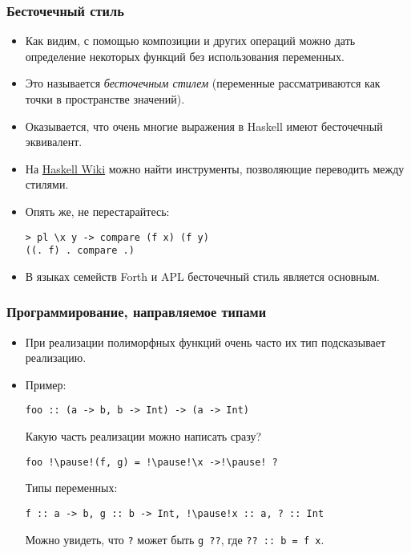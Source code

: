 \documentclass[10pt]{beamer}
\begin{document}
\begin{frame}[fragile]
\frametitle{Бесточечный стиль}
\begin{itemize}
    \item Как видим, с помощью композиции и других операций можно дать определение некоторых функций без использования переменных.
    \item Это называется \emph{бесточечным стилем} (переменные рассматриваются как точки в пространстве значений).\pause
    \item Оказывается, что очень многие выражения в Haskell имеют бесточечный эквивалент.
    \item На \href{https://wiki.haskell.org/Pointfree}{Haskell Wiki} можно найти инструменты, позволяющие переводить между стилями.
    \item Опять же, не перестарайтесь:
\begin{lstlisting}
> pl \x y -> compare (f x) (f y)
((. f) . compare .)
\end{lstlisting}\pause
    \item В языках семейств Forth и APL бесточечный стиль является основным.
\end{itemize}
\end{frame}

\begin{frame}[fragile]
\frametitle{Программирование, направляемое типами}
\begin{itemize}
    \item При реализации полиморфных функций очень часто их тип подсказывает реализацию. 
    \item Пример:
\begin{lstlisting}
foo :: (a -> b, b -> Int) -> (a -> Int)
\end{lstlisting}
Какую часть реализации можно написать сразу?
\begin{lstlisting}
foo !\pause!(f, g) = !\pause!\x ->!\pause! ?
\end{lstlisting}
Типы переменных:\pause
\begin{lstlisting}
f :: a -> b, g :: b -> Int, !\pause!x :: a, ? :: Int
\end{lstlisting}
Можно увидеть, что \lstinline|?| может быть \lstinline|g ??|, где \lstinline|?? :: |\pause\lstinline|b = |\pause\lstinline|f x|.
\end{itemize}
\end{frame}
\end{document}
